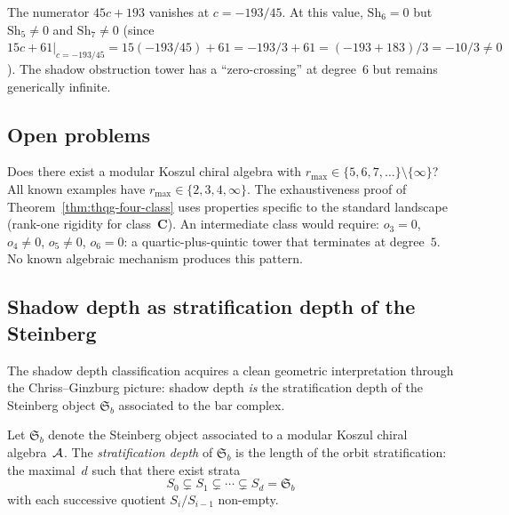\begin{computation}
The numerator $45c + 193$ vanishes at $c = -193/45$. At this
value, $\mathrm{Sh}_6 = 0$ but $\mathrm{Sh}_5 \neq 0$ and
$\mathrm{Sh}_7 \neq 0$ (since $15c + 61|_{c=-193/45} =
15(-193/45) + 61 = -193/3 + 61 = (-193 + 183)/3 = -10/3 \neq 0$).
The shadow obstruction tower has a ``zero-crossing'' at degree~$6$ but remains
generically infinite.
\end{computation}



\subsection{Open problems}

\begin{openproblem}
\label{open:thqg-gap}
Does there exist a modular Koszul chiral algebra with
$r_{\max} \in \{5, 6, 7, \ldots\} \setminus \{\infty\}$?
All known examples have $r_{\max} \in \{2, 3, 4, \infty\}$.
The exhaustiveness proof of
Theorem~\ref{thm:thqg-four-class} uses properties specific
to the standard landscape (rank-one rigidity for
class~$\mathbf{C}$). An intermediate class would require:
$o_3 = 0$, $o_4 \neq 0$, $o_5 \neq 0$, $o_6 = 0$: a
quartic-plus-quintic tower that terminates at degree~$5$.
No known algebraic mechanism produces this pattern.
\end{openproblem}


\subsection{Shadow depth as stratification depth of the Steinberg}

The shadow depth classification acquires a clean geometric
interpretation through the Chriss--Ginzburg picture: shadow
depth \emph{is} the stratification depth of the Steinberg
object $\mathfrak{S}_b$ associated to the bar complex.

\begin{definition}
Let $\mathfrak{S}_b$ denote the Steinberg object associated
to a modular Koszul chiral algebra~$\mathcal{A}$. The
\emph{stratification depth} of $\mathfrak{S}_b$ is the
length of the orbit stratification: the maximal~$d$ such
that there exist strata
\[
 S_0 \subsetneq S_1 \subsetneq \cdots \subsetneq S_d
 = \mathfrak{S}_b
\]
with each successive quotient $S_i / S_{i-1}$ non-empty.
\end{definition}

